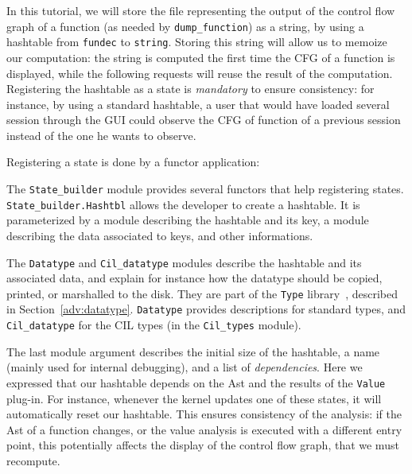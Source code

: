 In this tutorial, we will store the file representing the \dottool
output of the control flow graph of a function (as needed by
\texttt{dump\_function}) as a string, by using a hashtable from \texttt{fundec}
to \texttt{string}. Storing this string will allow us to memoize~\cite{michie68}
our computation: the string is computed the first time the CFG of a
function is displayed, while the following requests will reuse the result of
the computation. Registering the hashtable as a \framac state is
\emph{mandatory} to ensure \framac consistency: for instance, by using a
standard \caml hashtable, a user that would have loaded several session through
the GUI could observe the CFG of function of a previous session instead of the
one he wants to observe.

Registering a state is done by a functor application:


The \texttt{State\_builder} module provides several functors that help
registering states. \texttt{State\_builder.Hashtbl} allows the developer to
create a hashtable. It is parameterized by a module describing the hashtable
and its key, a module describing the data associated to keys, and
other informations. 

The \texttt{Datatype} and \texttt{Cil\_datatype} modules describe the
hashtable and its associated data, and explain for instance how the
datatype should be copied, printed, or marshalled to the disk. They
are part of the \texttt{Type} library~\cite{signoles:jfla11}, described in
Section~\ref{adv:datatype}. \texttt{Datatype} provides
descriptions for standard \caml types, and \texttt{Cil\_datatype} for
the CIL types (in the \texttt{Cil\_types} module).

The last module argument describes the initial size of the hashtable, a name
(mainly used for internal debugging), and a list of \emph{dependencies}. Here we
expressed that our hashtable depends on the Ast and the results of the
\texttt{Value} plug-in. For instance, whenever the \framac kernel updates one of these
states, it will automatically reset our hashtable. This ensures consistency of
the analysis: if the Ast of a function changes, or the value analysis is
executed with a different entry point, this potentially affects the display of
the control flow graph, that we must recompute.


